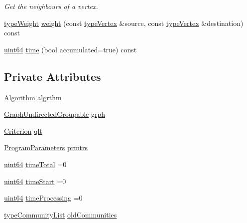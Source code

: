 \begin{DoxyCompactItemize}
\begin{DoxyCompactList}\small\item\em Get the neighbours of a vertex. \end{DoxyCompactList}\item 
\hyperlink{edge_8h_a2e7ea3be891ac8b52f749ec73fee6dd2}{type\+Weight} \hyperlink{classDynCommBase_ae48a572da3c7b375429e96e717b15787}{weight} (const \hyperlink{edge_8h_a5fbd20c46956d479cb10afc9855223f6}{type\+Vertex} \&source, const \hyperlink{edge_8h_a5fbd20c46956d479cb10afc9855223f6}{type\+Vertex} \&destination) const
\item 
\hyperlink{systemDefines_8h_abc0f5bc07737e498f287334775dff2b6}{uint64} \hyperlink{classDynCommBase_a5b40eb14cef877fde1db8b6476f6a2ce}{time} (bool accumulated=true) const
\end{DoxyCompactItemize}
\subsection*{Private Attributes}
\begin{DoxyCompactItemize}
\item 
\hyperlink{classAlgorithm}{Algorithm} \hyperlink{classDynCommBase_a966f54b7ba340fa782146659998760ed}{algrthm}
\item 
\hyperlink{classGraphUndirectedGroupable}{Graph\+Undirected\+Groupable} \hyperlink{classDynCommBase_ae79d443436131554acb4b3ed24908701}{grph}
\item 
\hyperlink{classCriterion}{Criterion} \hyperlink{classDynCommBase_a6de9b4c868b4b8ca2923db6f6b1f08f7}{qlt}
\item 
\hyperlink{structProgramParameters}{Program\+Parameters} \hyperlink{classDynCommBase_a61a92fd07b37a8153fda9cfebd779dc4}{prmtrs}
\item 
\hyperlink{systemDefines_8h_abc0f5bc07737e498f287334775dff2b6}{uint64} \hyperlink{classDynCommBase_ac796111a001f3c815d4b72e66da47cc2}{time\+Total} =0
\item 
\hyperlink{systemDefines_8h_abc0f5bc07737e498f287334775dff2b6}{uint64} \hyperlink{classDynCommBase_a7795433997aa908ce2b8be2b3f15aba0}{time\+Start} =0
\item 
\hyperlink{systemDefines_8h_abc0f5bc07737e498f287334775dff2b6}{uint64} \hyperlink{classDynCommBase_ae63166e1cbb91574ff23e4c667fad445}{time\+Processing} =0
\item 
\hyperlink{graphUndirectedGroupable_8h_a8d8ff0ef0315e7cd3b62e467487cd0e1}{type\+Community\+List} \hyperlink{classDynCommBase_ac8cd68d0bff480bc59878668369aa2a5}{old\+Communities}
\end{DoxyCompactItemize}
